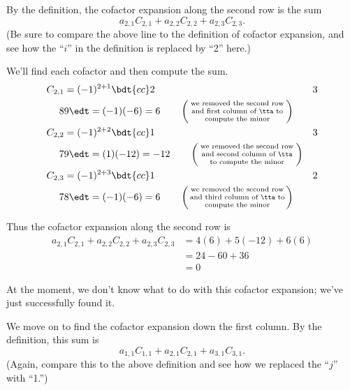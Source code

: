 {By the definition, the cofactor expansion along the second row is the sum 
\[
a_{2,1}C_{2,1} + a_{2,2}C_{2,2} + a_{2,3}C_{2,3}.
\]
(Be sure to compare the above line to the definition of cofactor expansion, and see how the ``$i$'' in the definition is replaced by ``2'' here.)

We'll find each cofactor and then compute the sum.
\begin{align*}
C_{2,1} &= (-1)^{2+1}\bdt{cc}2&3\\8&9\edt  = (-1)(-6) = 6 \quad\quad \left(\parbox{100pt}{\centering\scriptsize we removed the second row and first column of \tta\ to compute the minor}\right)\\
C_{2,2} &= (-1)^{2+2}\bdt{cc}1&3\\7&9\edt = (1)(-12) = -12 \quad\quad \left(\parbox{100pt}{\centering\scriptsize we removed the second row and second column of \tta\ to compute the minor}\right)\\
C_{2,3} &= (-1)^{2+3}\bdt{cc}1&2\\7&8\edt = (-1)(-6) = 6 \quad\quad \left(\parbox{100pt}{\centering\scriptsize we removed  the second row and third column of \tta\ to compute the minor}\right)
\end{align*}


Thus the cofactor expansion along the second row is
\begin{align*}
a_{2,1}C_{2,1} + a_{2,2}C_{2,2} + a_{2,3}C_{2,3} &= 4(6) + 5(-12) + 6(6) \\
&= 24-60+36\\
&= 0
\end{align*}

At the moment, we don't know what to do with this cofactor expansion; we've just successfully found it.

We move on to find the cofactor expansion down the first column. By the definition, this sum is
\[
a_{1,1}C_{1,1} + a_{2,1}C_{2,1} + a_{3,1}C_{3,1}.
\]
(Again, compare this to the above definition and see how we replaced the ``$j$'' with ``1.'')

}
